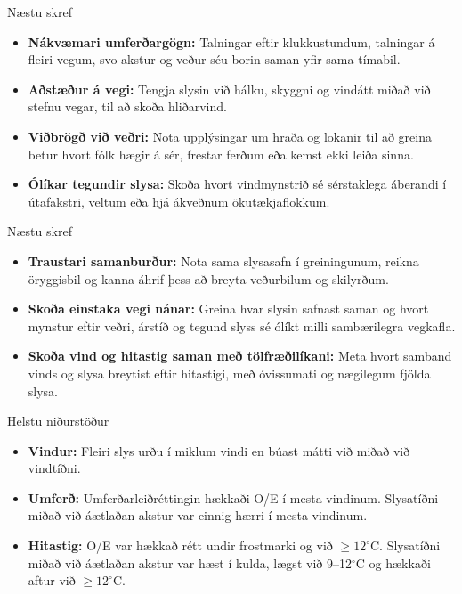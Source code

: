 \documentclass[aspectratio=169,12pt,t]{beamer}
\begin{document}
\begin{frame}{Næstu skref}
\relax
\begin{itemize}\points
\item \textbf{Nákvæmari umferðargögn:} Talningar eftir klukkustundum, talningar á fleiri vegum, svo akstur og veður séu borin saman yfir sama tímabil.
\item \textbf{Aðstæður á vegi:} Tengja slysin við hálku, skyggni og vindátt miðað við stefnu vegar, til að skoða hliðarvind.
\item \textbf{Viðbrögð við veðri:} Nota upplýsingar um hraða og lokanir til að greina betur hvort fólk hægir á sér, frestar ferðum eða kemst ekki leiða sinna.
\item \textbf{Ólíkar tegundir slysa:} Skoða hvort vindmynstrið sé sérstaklega áberandi í útafakstri, veltum eða hjá ákveðnum ökutækjaflokkum.
\end{itemize}
\end{frame}

\begin{frame}{Næstu skref}
\begin{itemize}\points
\item \textbf{Traustari samanburður:} Nota sama slysasafn í greiningunum, reikna öryggisbil og kanna áhrif þess að breyta veðurbilum og skilyrðum.
\item \textbf{Skoða einstaka vegi nánar:} Greina hvar slysin safnast saman og hvort mynstur eftir veðri, árstíð og tegund slyss sé ólíkt milli sambærilegra vegkafla.
\item \textbf{Skoða vind og hitastig saman með tölfræðilíkani:} Meta hvort samband vinds og slysa breytist eftir hitastigi, með óvissumati og nægilegum fjölda slysa.
\end{itemize}
\end{frame}

\begin{frame}{Helstu niðurstöður}
\relax
\begin{itemize}\points
\item \textbf{Vindur:} Fleiri slys urðu í miklum vindi en búast mátti við miðað við vindtíðni.
\item \textbf{Umferð:} Umferðarleiðréttingin hækkaði O/E í mesta vindinum. Slysatíðni miðað við áætlaðan akstur var einnig hærri í mesta vindinum.
\item \textbf{Hitastig:} O/E var hækkað rétt undir frostmarki og við $\geq12^{\circ}$C. Slysatíðni miðað við áætlaðan akstur var hæst í kulda, lægst við 9--12$^{\circ}$C og hækkaði aftur við $\geq12^{\circ}$C.
\end{itemize}
\end{frame}
\end{document}
